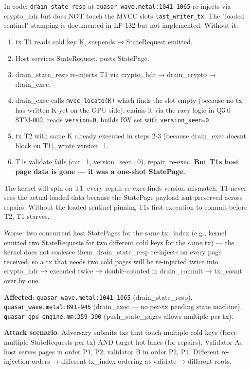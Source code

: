\documentclass[
]{article}
\providecommand{\tightlist}{%
  \setlength{\itemsep}{0pt}\setlength{\parskip}{0pt}}
\begin{document}
In code: \texttt{drain\_state\_resp} at
\texttt{quasar\_wave.metal:1041-1065} re-injects via crypto\_hdr but
does NOT touch the MVCC slot\textquotesingle s
\texttt{last\_writer\_tx}. The "loaded sentinel" stamping is documented
in LP-132 but not implemented. Without it:

\begin{enumerate}
\def\labelenumi{\arabic{enumi}.}
\tightlist
\item
  tx T1 reads cold key K, suspends → StateRequest emitted.
\item
  Host services StateRequest, posts StatePage.
\item
  drain\_state\_resp re-injects T1 via crypto\_hdr → drain\_crypto →
  drain\_exec.
\item
  drain\_exec calls \texttt{mvcc\_locate(K)} which finds the slot empty
  (because no tx has written K yet on the GPU side), claims it via the
  racy logic in Q3.0-STM-002, reads \texttt{version=0}, builds RW set
  with \texttt{version\_seen=0}.
\item
  tx T2 with same K already executed in steps 2-3 (because drain\_exec
  doesn\textquotesingle t block on T1), wrote version=1.
\item
  T1\textquotesingle s validate fails (cur=1, version\_seen=0), repair,
  re-exec. \textbf{But T1\textquotesingle s host page data is gone ---
  it was a one-shot StatePage.}
\end{enumerate}

The kernel will spin on T1: every repair re-exec finds version mismatch,
T1 never sees the actual loaded data because the StatePage payload
isn\textquotesingle t preserved across repairs. Without the loaded
sentinel pinning T1\textquotesingle s first execution to commit before
T2, T1 starves.

Worse: two concurrent host StatePages for the same tx\_index (e.g.,
kernel emitted two StateRequests for two different cold keys for the
same tx) --- the kernel does not coalesce them. drain\_state\_resp
re-injects on every page received, so a tx that needs two cold pages
will be re-injected twice into crypto\_hdr → executed twice →
double-counted in drain\_commit → tx\_count over by one.

\textbf{Affected}: \texttt{quasar\_wave.metal:1041-1065}
(drain\_state\_resp), \texttt{quasar\_wave.metal:891-945} (drain\_exec
--- no per-tx pending state machine),
\texttt{quasar\_gpu\_engine.mm:359-390} (push\_state\_pages allows
multiple per tx).

\textbf{Attack scenario}. Adversary submits txs that touch multiple cold
keys (force multiple StateRequests per tx) AND target hot lanes (for
repairs). Validator A\textquotesingle s host serves pages in order P1,
P2; validator B in order P2, P1. Different re-injection orders →
different tx\_index ordering at validate → different roots.
\end{document}
